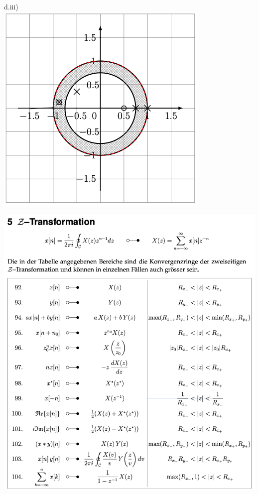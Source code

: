 \documentclass[11pt]{article}
\begin{document}
\hfill
\begin{minipage}[t]{0.25\textwidth}
    d.iii)\\
    \includegraphics[width=\linewidth]{docimgs/diii.png}
\end{minipage}


\pagebreak

\includegraphics[width=\linewidth]{docimgs/Z-Transformation.png}
\end{document}
